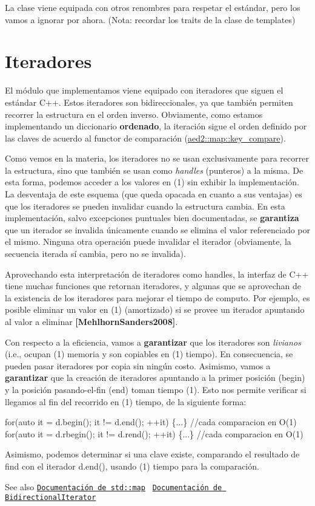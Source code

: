 La clase viene equipada con otros renombres para respetar el estándar, pero los vamos a ignorar por ahora. (Nota\+: recordar los traits de la clase de templates)\hypertarget{Interfaz_Iteradores}{}\section{Iteradores}\label{Interfaz_Iteradores}
El módulo que implementamos viene equipado con iteradores que siguen el estándar C++. Estos iteradores son bidireccionales, ya que también permiten recorrer la estructura en el orden inverso. Obviamente, como estamos implementando un diccionario {\bfseries ordenado}, la iteración sigue el orden definido por las claves de acuerdo al functor de comparación (\hyperlink{classaed2_1_1map_a3efa081d3379ab76f33a5ef9fe697523}{aed2\+::map\+::key\+\_\+compare}).

Como vemos en la materia, los iteradores no se usan exclusivamente para recorrer la estructura, sino que también se usan como {\itshape handles} (punteros) a la misma. De esta forma, podemos acceder a los valores en (1) sin exhibir la implementación. La desventaja de este esquema (que queda opacada en cuanto a sus ventajas) es que los iteradores se pueden invalidar cuando la estructura cambia. En esta implementación, salvo excepciones puntuales bien documentadas, se {\bfseries garantiza} que un iterador se invalida únicamente cuando se elimina el valor referenciado por el mismo. Ninguna otra operación puede invalidar el iterador (obviamente, la secuencia iterada sí cambia, pero no se invalida).

Aprovechando esta interpretación de iteradores como handles, la interfaz de C++ tiene muchas funciones que retornan iteradores, y algunas que se aprovechan de la existencia de los iteradores para mejorar el tiempo de computo. Por ejemplo, es posible eliminar un valor en (1) (amortizado) si se provee un iterador apuntando al valor a eliminar {\bfseries [Mehlhorn\+Sanders2008]}.

Con respecto a la eficiencia, vamos a {\bfseries garantizar} que los iteradores son {\itshape livianos} (i.\+e., ocupan (1) memoria y son copiables en (1) tiempo). En consecuencia, se pueden pasar iteradores por copia sin ningún costo. Asimismo, vamos a {\bfseries garantizar} que la creación de iteradores apuntando a la primer posición ({\ttfamily begin}) y la posición pasando-\/el-\/fin ({\ttfamily end}) toman tiempo (1). Esto nos permite verificar si llegamos al fin del recorrido en (1) tiempo, de la siguiente forma\+: 
\begin{DoxyCode}
\textcolor{keywordflow}{for}(\textcolor{keyword}{auto} it = d.begin(); it != d.end(); ++it) \{...\}   \textcolor{comment}{//cada comparacion en O(1)}
\textcolor{keywordflow}{for}(\textcolor{keyword}{auto} it = d.rbegin(); it != d.rend(); ++it) \{...\} \textcolor{comment}{//cada comparacion en O(1)}
\end{DoxyCode}
 Asimismo, podemos determinar si una clave existe, comparando el resultado de {\ttfamily find} con el iterador {\ttfamily d.\+end()}, usando (1) tiempo para la comparación.

\begin{DoxySeeAlso}{See also}
\href{http://en.cppreference.com/w/cpp/container/map}{\tt Documentación de std\+::map}~\newline
 \href{http://en.cppreference.com/w/cpp/concept/BidirectionalIterator}{\tt Documentación de Bidirectional\+Iterator} 
\end{DoxySeeAlso}
